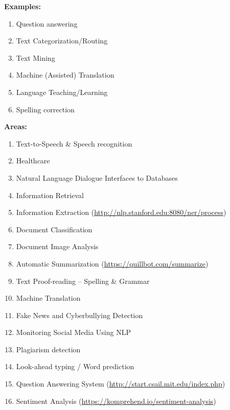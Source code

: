 \textbf{Examples:}
\begin{enumerate}
    \item Question answering
    \item Text Categorization/Routing
    \item Text Mining
    \item Machine (Assisted) Translation
    \item Language Teaching/Learning
    \item Spelling correction
\end{enumerate}

\vspace{0.3cm}

\textbf{Areas:}
\begin{enumerate}
    \item Text-to-Speech \& Speech recognition
    \item Healthcare
    \item Natural Language Dialogue Interfaces to Databases
    \item Information Retrieval
    \item Information Extraction (\href{http://nlp.stanford.edu:8080/ner/process}{http://nlp.stanford.edu:8080/ner/process}) 
    \item Document Classification
    \item Document Image Analysis
    \item Automatic Summarization (\href{https://quillbot.com/summarize}{https://quillbot.com/summarize}) 
    \item Text Proof-reading – Spelling \& Grammar
    \item Machine Translation
    \item Fake News and Cyberbullying Detection
    \item Monitoring Social Media Using NLP
    \item Plagiarism detection
    \item Look-ahead typing / Word prediction
    \item Question Answering System (\href{http://start.csail.mit.edu/index.php}{http://start.csail.mit.edu/index.php}) 
    \item Sentiment Analysis (\href{https://komprehend.io/sentiment-analysis}{https://komprehend.io/sentiment-analysis}) 
\end{enumerate}






















































